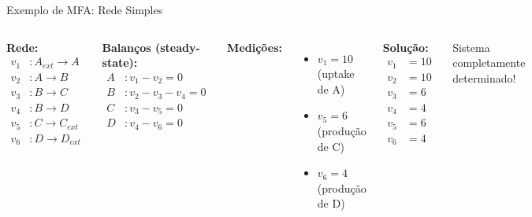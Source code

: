 \begin{frame}{Exemplo de MFA: Rede Simples}
\begin{columns}
\textbf{Rede:}
\begin{align*}
v_1&: A_{ext} \rightarrow A\\
v_2&: A \rightarrow B\\
v_3&: B \rightarrow C\\
v_4&: B \rightarrow D\\
v_5&: C \rightarrow C_{ext}\\
v_6&: D \rightarrow D_{ext}
\end{align*}

\textbf{Balanços (steady-state):}
\begin{align*}
A&: v_1 - v_2 = 0\\
B&: v_2 - v_3 - v_4 = 0\\
C&: v_3 - v_5 = 0\\
D&: v_4 - v_6 = 0
\end{align*}

\textbf{Medições:}
\begin{itemize}
    \item $v_1 = 10$ (uptake de A)
    \item $v_5 = 6$ (produção de C)
    \item $v_6 = 4$ (produção de D)
\end{itemize}

\textbf{Solução:}
\begin{align*}
v_1 &= 10\\
v_2 &= 10\\
v_3 &= 6\\
v_4 &= 4\\
v_5 &= 6\\
v_6 &= 4
\end{align*}

Sistema completamente determinado!
\end{columns}
\end{frame}

